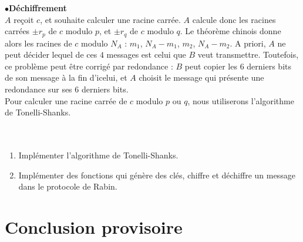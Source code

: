 $\bullet$\textbf{Déchiffrement}\\
$A$ reçoit $c$, et souhaite calculer une racine carrée. $A$ calcule donc les racines carrées  $\pm r_p$ de $c$ modulo $p$, et  $\pm r_q$ de $c$ modulo $q$. Le théorème chinois donne alors les racines de $c$ modulo $N_A$ : $m_1$, $N_A-m_1$, $m_2$, $N_A-m_2$. A priori, $A$ ne peut décider lequel de ces $4$ messages est celui que $B$ veut transmettre. Toutefois, ce problème peut être corrigé par redondance : $B$ peut copier les $6$ derniers bits de son message à la fin d'icelui, et $A$ choisit le message qui présente une redondance sur ses $6$ derniers bits.\\

Pour calculer une racine carrée de $c$ modulo $p$ ou $q$, nous utiliserons l'algorithme de Tonelli-Shanks.\\

\\
\\

\begin{enumerate}
\item Implémenter l'algorithme de Tonelli-Shanks.
\item Implémenter des fonctions qui génère des clés, chiffre et déchiffre un message dans le protocole de Rabin.
\end{enumerate}

\section{Conclusion provisoire}

